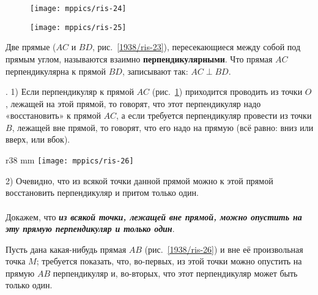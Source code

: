 \begin{figure}[h!]
\begin{minipage}{.48\textwidth}
\centering
\texttt{[image: mppics/ris-24]}
\end{minipage}\hfill
\begin{minipage}{.48\textwidth}
\centering
\texttt{[image: mppics/ris-25]}
\end{minipage}

\medskip

\begin{minipage}{.48\textwidth}
\centering
\caption{}\label{1938/ris-24}
\end{minipage}\hfill
\begin{minipage}{.48\textwidth}
\centering
\caption{}\label{1938/ris-25}
\end{minipage}
\vskip-4mm
\end{figure}

Две прямые ($AC$ и $BD$, рис.~\ref{1938/ris-23}), пересекающиеся между собой под прямым углом, называются взаимно \textbf{перпендикулярными}.
Что прямая $AC$ перпендикулярна к прямой $BD$, записывают так: $AC\perp BD$.

\smallskip

\mbox{.}
1) Если перпендикуляр к прямой $AC$ (рис.~\ref{1938/ris-25}) приходится проводить из точки $O$, лежащей на этой прямой, то говорят, что этот перпендикуляр надо «восстановить» к прямой $AC$, а если требуется перпендикуляр провести из точки $B$, лежащей вне прямой, то говорят, что его надо  на прямую (всё равно:
вниз или вверх, или вбок).

\begin{wrapfigure}[11]{r}{38 mm}
\centering
\texttt{[image: mppics/ris-26]}
\caption{}\label{1938/ris-26}
\end{wrapfigure}

2) Очевидно, что из всякой точки данной прямой можно к этой прямой восстановить перпендикуляр и притом только один.

\paragraph{}\label{1938/24}
Докажем, что \textbf{\emph{из всякой точки, лежащей вне прямой, можно опустить на эту прямую перпендикуляр и только один}}.

Пусть дана какая-нибудь прямая $AB$ (рис.~\ref{1938/ris-26}) и вне её произвольная точка $M$;
требуется показать, что, во-первых, из этой точки можно опустить на прямую $AB$ перпендикуляр и, во-вторых, что этот перпендикуляр может быть только один.

